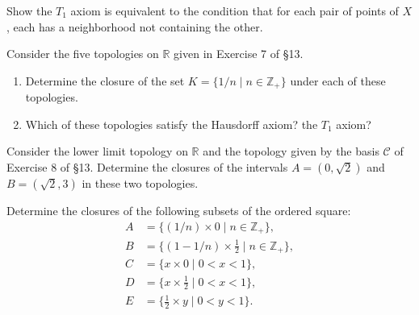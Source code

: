   \begin{exercise}[Munkres 17.15]
    Show the $T_1$ axiom is equivalent to the condition that for each pair of points of $X$, each has a neighborhood not containing the other.
  \end{exercise}
  \begin{solution}
    
  \end{solution}

  \begin{exercise}[Munkres 17.16]
    Consider the five topologies on $\mathbb{R}$ given in Exercise 7 of \S13.
    \begin{enumerate}
      \item Determine the closure of the set $K = \{1/n \mid n \in \mathbb{Z}_+\}$ under each of these topologies.
      \item Which of these topologies satisfy the Hausdorff axiom? the $T_1$ axiom?
    \end{enumerate}
  \end{exercise}
  \begin{solution}
    
  \end{solution}

  \begin{exercise}[Munkres 17.17]
    Consider the lower limit topology on $\mathbb{R}$ and the topology given by the basis $\mathcal{C}$ of Exercise 8 of \S13. Determine the closures of the intervals $A = (0, \sqrt{2})$ and $B = (\sqrt{2}, 3)$ in these two topologies.
  \end{exercise}
  \begin{solution}
    
  \end{solution}

  \begin{exercise}[Munkres 17.18]
    Determine the closures of the following subsets of the ordered square:
    \begin{align*}
      A &= \{(1/n) \times 0 \mid n \in \mathbb{Z}_+\}, \\
      B &= \{(1 - 1/n) \times \frac{1}{2} \mid n \in \mathbb{Z}_+\}, \\
      C &= \{x \times 0 \mid 0 < x < 1\}, \\
      D &= \{x \times \frac{1}{2} \mid 0 < x < 1\}, \\
      E &= \{\frac{1}{2} \times y \mid 0 < y < 1\}.
    \end{align*}
  \end{exercise}
  \begin{solution}
    
  \end{solution}

